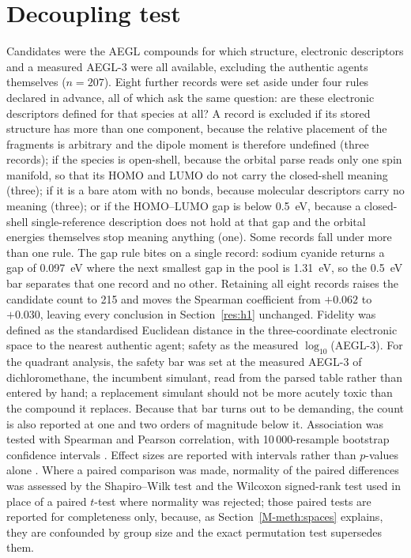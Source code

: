 \documentclass[journal=jacsat,manuscript=suppinfo,margin=1in]{achemso}
\begin{document}
\section{Decoupling test}
\label{meth:decoupling}
Candidates were the AEGL compounds for which structure, electronic descriptors
and a measured AEGL-3 were all available, excluding the authentic agents
themselves ($n=207$). Eight further records were set aside under four rules
declared in advance, all of which ask the same question: are these electronic
descriptors defined for that species at all? A record is excluded if
its stored structure has more than one component, because the relative placement
of the fragments is arbitrary and the dipole moment is therefore undefined
(three records); if the species is open-shell, because the orbital parse reads
only one spin manifold, so that its HOMO and LUMO do not carry the
closed-shell meaning (three); if it is a bare atom with no
bonds, because molecular descriptors carry no meaning (three); or if the
HOMO--LUMO gap is below 0.5~eV, because a closed-shell single-reference
description does not hold at that gap and the orbital energies themselves stop
meaning anything (one). Some records fall under more than one
rule. The gap rule bites on a single record: sodium cyanide returns
a gap of 0.097~eV where the next smallest gap in the pool is 1.31~eV, so the
0.5~eV bar separates that one record and no other. Retaining all eight
records raises the candidate count to 215 and moves the Spearman coefficient
from $+0.062$ to $+0.030$, leaving
every conclusion in Section~\ref{res:h1} unchanged. Fidelity was defined as the standardised
Euclidean distance in the three-coordinate electronic space to the nearest
authentic agent; safety as the measured $\log_{10}$(AEGL-3). For the quadrant analysis, the safety bar
was set at the measured AEGL-3 of dichloromethane, the incumbent
simulant, read from the parsed table rather than entered by hand; a replacement
simulant should not be more acutely toxic than the compound it replaces. Because
that bar turns out to be demanding, the count is also reported at one and two
orders of magnitude below it. Association was tested with Spearman and
Pearson correlation, with 10\,000-resample bootstrap confidence intervals
\cite{efron1986}. Effect sizes are reported with intervals rather than
$p$-values alone \cite{nakagawa2007}. Where a paired comparison was made,
normality of the paired differences was assessed by the Shapiro--Wilk test
\cite{shapiro1965} and the Wilcoxon signed-rank test \cite{wilcoxon1945} used
in place of a paired $t$-test where normality was rejected; those paired tests
are reported for completeness only, because, as Section~\ref{M-meth:spaces} explains,
they are confounded by group size and the exact permutation test supersedes them.
\end{document}

